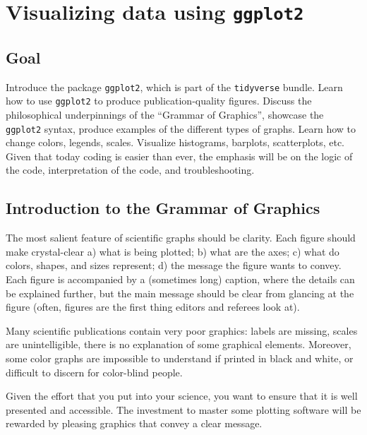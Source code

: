 \documentclass[
  letterpaper,
  DIV=11,
  numbers=noendperiod]{scrreprt}
\begin{document}

\chapter{\texorpdfstring{Visualizing data using
\texttt{ggplot2}}{Visualizing data using ggplot2}}\label{visualizing-data-using-ggplot2}

\section{Goal}\label{goal-1}

Introduce the package \texttt{ggplot2}, which is part of the
\texttt{tidyverse} bundle. Learn how to use \texttt{ggplot2} to produce
publication-quality figures. Discuss the philosophical underpinnings of
the ``Grammar of Graphics'', showcase the \texttt{ggplot2} syntax,
produce examples of the different types of graphs. Learn how to change
colors, legends, scales. Visualize histograms, barplots, scatterplots,
etc. Given that today coding is easier than ever, the emphasis will be
on the logic of the code, interpretation of the code, and
troubleshooting.

\section{Introduction to the Grammar of
Graphics}\label{introduction-to-the-grammar-of-graphics}

The most salient feature of scientific graphs should be clarity. Each
figure should make crystal-clear a) what is being plotted; b) what are
the axes; c) what do colors, shapes, and sizes represent; d) the message
the figure wants to convey. Each figure is accompanied by a (sometimes
long) caption, where the details can be explained further, but the main
message should be clear from glancing at the figure (often, figures are
the first thing editors and referees look at).

Many scientific publications contain very poor graphics: labels are
missing, scales are unintelligible, there is no explanation of some
graphical elements. Moreover, some color graphs are impossible to
understand if printed in black and white, or difficult to discern for
color-blind people.

Given the effort that you put into your science, you want to ensure that
it is well presented and accessible. The investment to master some
plotting software will be rewarded by pleasing graphics that convey a
clear message.
\end{document}
